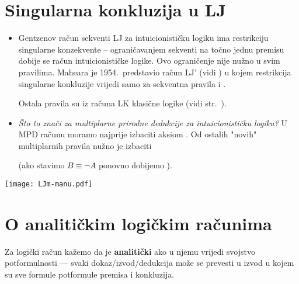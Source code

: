 \section{Singularna konkluzija u LJ}
\begin{itemize}
 \item Gentzenov račun sekventi LJ za intuicionističku logiku ima restrikciju singularne konzekvente -- ograničavanjem
sekventi na 
       točno jednu premisu dobije se račun intuicionističke logike. 
       Ovo ograničenje nije nužno u svim pravilima. Maheara je 1954.~predstavio račun LJ' (vidi
\cite{negri2008structural}) u kojem 
       restrikcija singularne konkluzije vrijedi samo  za sekventna pravila  i  .
 
	Ostala pravila su iz računa LK klasične logike (vidi str.~\pageref{gentzen:LK}).

\item \textit{Što to znači za multiplarne prirodne dedukcije za intuicionističku logiku?}\newline
       U MPD računu moramo najprije izbaciti aksiom . Od ostalih "novih" multiplarnih pravila nužno je
izbaciti \intr{\to}
% 
\begin{mathpar}
\end{mathpar}
(ako stavimo $B \equiv \neg A$ ponovno dobijemo ).
% 
\end{itemize}


\begin{center}
 \texttt{[image: LJm-manu.pdf]}
\end{center}







\section{O analitičkim logičkim računima}

Za logički račun kažemo da je \textbf{analitički} ako u njemu vrijedi svojstvo 
potformulnosti 
--- 
svaki dokaz/izvod/dedukcija može se prevesti u izvod u kojem su sve formule potformule  premisa i konkluzija.

